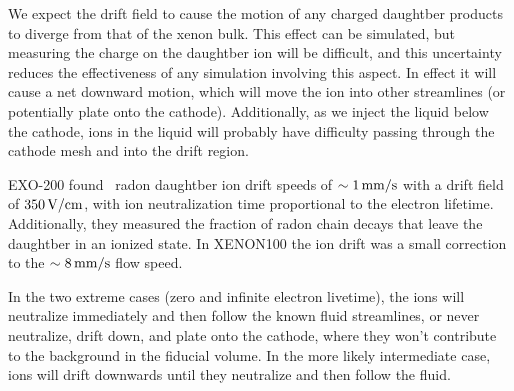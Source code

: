 We expect the drift field to cause the motion of any charged daughtber products to diverge from that of the xenon bulk. This effect can be simulated, but measuring the charge on the daughtber ion will be difficult, and this uncertainty reduces the effectiveness of any simulation involving this aspect. In effect it will cause a net downward motion, which will move the ion into other streamlines (or potentially plate onto the cathode). Additionally, as we inject the liquid below the cathode, ions in the liquid will probably have difficulty passing through the cathode mesh and into the drift region.

EXO-200 found~\cite{Albert:2015vma} radon daughtber ion drift speeds of $\sim 1\, \mathrm{mm/s}$ with a drift field of $350\, \mathrm{V/cm}$, with ion neutralization time proportional to the electron lifetime. Additionally, they measured the fraction of radon chain decays that leave the daughtber in an ionized state. In XENON100 the ion drift was a small correction to the $\sim 8\, \mathrm{mm/s}$ flow speed.

In the two extreme cases (zero and infinite electron livetime), the ions will neutralize immediately and then follow the known fluid streamlines, or never neutralize, drift down, and plate onto the cathode, where they won't contribute to the background in the fiducial volume. In the more likely intermediate case, ions will drift downwards until they neutralize and then follow the fluid.
